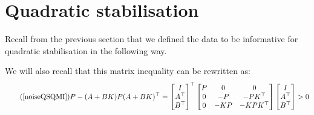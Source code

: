 \section{Quadratic stabilisation} \label{SectionQuadStab}



Recall from the previous section that we defined the data to be informative for quadratic stabilisation in the following way.


We will also recall that this matrix inequality can be rewritten as:
\begin{equation} \tag{\ref{noiseQSQMI}}
P - (A + BK) P (A + BK)^\top = 
\begin{bmatrix} I\\A^\top\\B^\top \end{bmatrix}^\top 
\begin{bmatrix} P&0&0\\0&-P&-PK^\top\\0&-KP&-KPK^\top \end{bmatrix} 
\begin{bmatrix} I\\A^\top\\B^\top \end{bmatrix} > 0
\end{equation}

